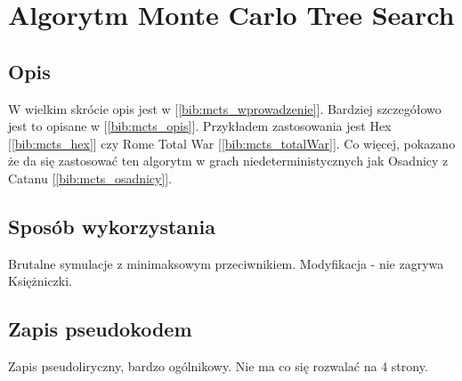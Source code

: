 \section{Algorytm Monte Carlo Tree Search}
\label{sec:mcts}
\subsection{Opis}

W wielkim skrócie opis jest w [\ref{bib:mcts_wprowadzenie}]. Bardziej szczegółowo jest to opisane w [\ref{bib:mcts_opis}]. Przykładem zastosowania jest Hex [\ref{bib:mcts_hex}] czy Rome Total War [\ref{bib:mcts_totalWar}]. Co więcej, pokazano że da się zastosować ten algorytm w grach niedeterministycznych jak Osadnicy z Catanu [\ref{bib:mcts_osadnicy}]. 


\subsection{Sposób wykorzystania}
Brutalne symulacje z minimaksowym przeciwnikiem. Modyfikacja - nie zagrywa Księżniczki. 

\subsection{Zapis pseudokodem}
Zapis pseudoliryczny, bardzo ogólnikowy. Nie ma co się rozwalać na 4 strony.


